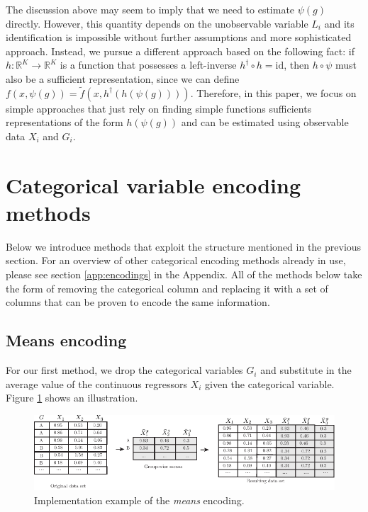 \documentclass{article}
\theoremstyle{plain}
\theoremstyle{definition}
\theoremstyle{remark}
\begin{document}
The discussion above may seem to imply that we need to estimate $\psi(g)$ directly. However, this quantity depends on the unobservable variable $L_{i}$ and its identification is  impossible without further assumptions and more sophisticated approach. Instead, we pursue a different approach based on the following fact: if $h: \mathbb{R}^{K} \rightarrow \mathbb{R}^{K}$ is a function that possesses a left-inverse $h^{\dagger} \circ h = \text{id}$, then $h \circ \psi$ must also be a sufficient representation, since we can define $f(x, \psi(g)) = \tilde{f}(x, h^{\dagger}(h(\psi(g))))$. Therefore, in this paper, we focus on simple approaches that just rely on finding simple functions sufficients representations of the form $h(\psi(g))$ and can be estimated using observable data $X_{i}$ and $G_{i}$.








\section{Categorical variable encoding methods}
\label{sec:categorical_encoding}

Below we introduce methods that exploit the structure mentioned in the previous section. For an overview of other categorical encoding methods already in use, please see section \ref{app:encodings} in the Appendix. All of the methods below take the form of removing the categorical column and replacing it with a set of columns that can be proven to encode the same information.


\subsection{Means encoding}
\label{subsec:means}

For our first method, we drop the categorical variables $G_{i}$ and substitute in the average value of the continuous regressors $X_{i}$ given the categorical variable. Figure \ref{fig:means_encoding} shows an illustration.


\begin{figure}[H]
  \centering
  \includegraphics[width=\textwidth]{figures/means_encoding.pdf}
  \caption{Implementation example of the \emph{means} encoding.}
  \label{fig:means_encoding}
\end{figure}
\end{document}

